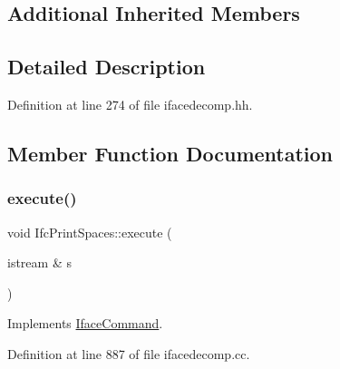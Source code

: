 \subsection*{Additional Inherited Members}


\subsection{Detailed Description}


Definition at line 274 of file ifacedecomp.\+hh.



\subsection{Member Function Documentation}
\mbox{\label{class_ifc_print_spaces_abc642427774b3e8e43054975ac5bf775}} 
\subsubsection{\texorpdfstring{execute()}{execute()}}
{\footnotesize\ttfamily void Ifc\+Print\+Spaces\+::execute (\begin{DoxyParamCaption}\item[{istream \&}]{s }\end{DoxyParamCaption})\hspace{0.3cm}{\ttfamily [virtual]}}



Implements \mbox{\hyperlink{class_iface_command_af10e29cee2c8e419de6efe9e680ad201}{Iface\+Command}}.



Definition at line 887 of file ifacedecomp.\+cc.

